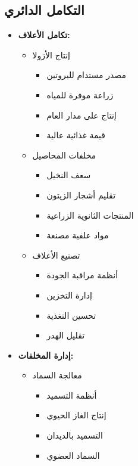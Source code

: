 \subsection{التكامل الدائري}
\begin{itemize}
    \item \textbf{تكامل الأعلاف:}
    \begin{itemize}
        \item إنتاج الأزولا
        \begin{itemize}
            \item مصدر مستدام للبروتين
            \item زراعة موفرة للمياه
            \item إنتاج على مدار العام
            \item قيمة غذائية عالية
        \end{itemize}
        
        \item مخلفات المحاصيل
        \begin{itemize}
            \item سعف النخيل
            \item تقليم أشجار الزيتون
            \item المنتجات الثانوية الزراعية
            \item مواد علفية مصنعة
        \end{itemize}
        
        \item تصنيع الأعلاف
        \begin{itemize}
            \item أنظمة مراقبة الجودة
            \item إدارة التخزين
            \item تحسين التغذية
            \item تقليل الهدر
        \end{itemize}
    \end{itemize}
    
    \item \textbf{إدارة المخلفات:}
    \begin{itemize}
        \item معالجة السماد
        \begin{itemize}
            \item أنظمة التسميد
            \item إنتاج الغاز الحيوي
            \item التسميد بالديدان
            \item السماد العضوي
        \end{itemize}
        

\end{itemize}
\end{itemize}
